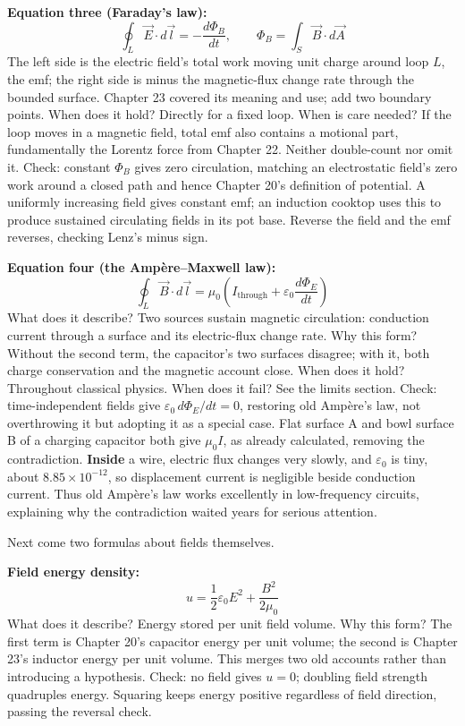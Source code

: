 \textbf{Equation three (Faraday's law):}
\[
\oint_L \vec E\cdot d\vec l=-\frac{d\varPhi_B}{dt},\qquad \varPhi_B=\int_S \vec B\cdot d\vec A
\]
The left side is the electric field's total work moving unit charge around loop \(L\), the emf; the right side is minus the magnetic-flux change rate through the bounded surface. Chapter 23 covered its meaning and use; add two boundary points. When does it hold? Directly for a fixed loop. When is care needed? If the loop moves in a magnetic field, total emf also contains a motional part, fundamentally the Lorentz force from Chapter 22. Neither double-count nor omit it. Check: constant \(\varPhi_B\) gives zero circulation, matching an electrostatic field's zero work around a closed path and hence Chapter 20's definition of potential. A uniformly increasing field gives constant emf; an induction cooktop uses this to produce sustained circulating fields in its pot base. Reverse the field and the emf reverses, checking Lenz's minus sign.

\textbf{Equation four (the Ampère--Maxwell law):}
\[
\oint_L \vec B\cdot d\vec l=\mu_0\left(I_{\text{through}}+\varepsilon_0\frac{d\varPhi_E}{dt}\right)
\]
What does it describe? Two sources sustain magnetic circulation: conduction current through a surface and its electric-flux change rate. Why this form? Without the second term, the capacitor's two surfaces disagree; with it, both charge conservation and the magnetic account close. When does it hold? Throughout classical physics. When does it fail? See the limits section. Check: time-independent fields give \(\varepsilon_0\,d\varPhi_E/dt=0\), restoring old Ampère's law, not overthrowing it but adopting it as a special case. Flat surface A and bowl surface B of a charging capacitor both give \(\mu_0 I\), as already calculated, removing the contradiction. \textbf{Inside} a wire, electric flux changes very slowly, and \(\varepsilon_0\) is tiny, about \(8.85\times10^{-12}\), so displacement current is negligible beside conduction current. Thus old Ampère's law works excellently in low-frequency circuits, explaining why the contradiction waited years for serious attention.

Next come two formulas about fields themselves.

\textbf{Field energy density:}
\[
u=\frac{1}{2}\varepsilon_0 E^{2}+\frac{B^{2}}{2\mu_0}
\]
What does it describe? Energy stored per unit field volume. Why this form? The first term is Chapter 20's capacitor energy per unit volume; the second is Chapter 23's inductor energy per unit volume. This merges two old accounts rather than introducing a hypothesis. Check: no field gives \(u=0\); doubling field strength quadruples energy. Squaring keeps energy positive regardless of field direction, passing the reversal check.

